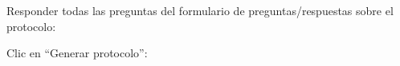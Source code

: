 \documentclass[12pt, spanish]{article}
\begin{document}
\begin{steps}
            \medskip
            \begin{minipage}[t]{\linewidth}
            \raggedright
        \end{minipage}

        \item Responder todas las preguntas del formulario de preguntas/respuestas sobre el protocolo:

            \medskip
            \begin{minipage}[t]{\linewidth}
            \raggedright
        \end{minipage}

        \item Clic en ``Generar protocolo'':


\end{steps}
\end{document}

